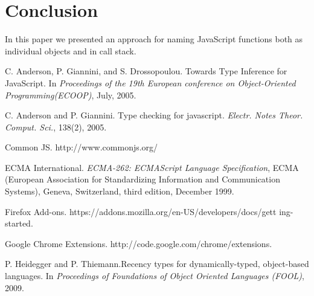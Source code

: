 \documentclass{acm_proc_article-sp}
\begin{document}
{\section{Conclusion}
In this paper we presented an approach for naming JavaScript functions both
as individual objects and in call stack. 



%

%
%
%

\begin{thebibliography}{10}

C. Anderson, P. Giannini, and S. Drossopoulou. \newblock Towards Type Inference for JavaScript.
\newblock In \emph{Proceedings of the 19th European conference on Object-Oriented Programming(ECOOP)},
July, 2005.

C. Anderson and P. Giannini. \newblock Type checking for javascript.
\newblock \emph{Electr. Notes Theor. Comput. Sci.}, 138(2), 2005. 

Common JS.
\newblock http://www.commonjs.org/

ECMA International.
\newblock \emph{ECMA-262: ECMAScript Language Specification},
ECMA (European Association for Standardizing Information
and Communication Systems), Geneva, Switzerland, third edition,
December 1999. 

Firefox Add-ons.
\newblock https://addons.mozilla.org/en-US/developers/docs/gett ing-started.

Google Chrome Extensions.
\newblock http://code.google.com/chrome/extensions.

P. Heidegger and P. Thiemann.\newblock Recency types for dynamically-typed, object-based languages.
\newblock In \emph{Proceedings of Foundations of Object Oriented Languages (FOOL)},
2009.


\end{thebibliography}}
\end{document}
